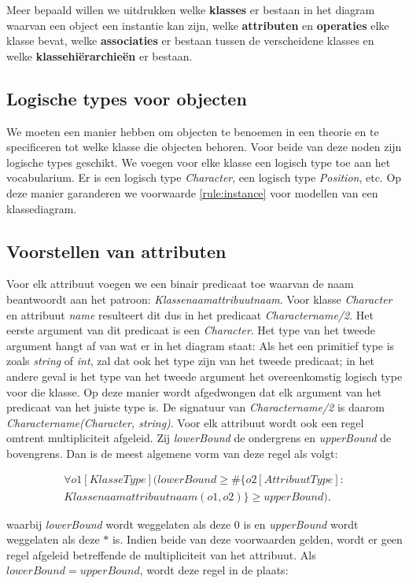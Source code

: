 Meer bepaald willen we uitdrukken welke \textbf{klasses} er bestaan in het diagram waarvan een object een instantie kan zijn, welke \textbf{attributen} en \textbf{operaties} elke klasse bevat, welke \textbf{associaties} er bestaan tussen de verscheidene klasses en welke \textbf{klassehi\"erarchie\"en} er bestaan.

\subsection{Logische types voor objecten}
We moeten een manier hebben om objecten te benoemen in een theorie en te specificeren tot welke klasse die objecten behoren. Voor beide van deze noden zijn logische types geschikt. We voegen voor elke klasse een logisch type toe aan het vocabularium. Er is een logisch type \textit{Character}, een logisch type \textit{Position}, etc. Op deze manier garanderen we voorwaarde \ref{rule:instance} voor modellen van een klassediagram.

\subsection{Voorstellen van attributen}
Voor elk attribuut voegen we een binair predicaat toe waarvan de naam beantwoordt aan het patroon: \textit{Klassenaamattribuutnaam}. Voor klasse \textit{Character} en attribuut \textit{name} resulteert dit dus in het predicaat \textit{Charactername/2}. Het eerste argument van dit predicaat is een \textit{Character}. Het type van het tweede argument hangt af van wat er in het diagram staat: Als het een primitief type is zoals \textit{string} of \textit{int}, zal dat ook het type zijn van het tweede predicaat; in het andere geval is het type van het tweede argument het overeenkomstig logisch type voor die klasse. Op deze manier wordt afgedwongen dat elk argument van het predicaat van het juiste type is.
De signatuur van \textit{Charactername/2} is daarom \textit{Charactername(Character, string)}.
Voor elk attribuut wordt ook een regel omtrent multipliciteit afgeleid. Zij \textit{lowerBound} de ondergrens en \textit{upperBound} de bovengrens. Dan is de meest algemene vorm van deze regel als volgt:
	
\begin{align*}
	\forall{o1}[KlasseType](lowerBound \geq \#\{o2 [AttribuutType] : \\ Klassenaamattribuutnaam(o1,o2)\} \geq upperBound).
\end{align*}
	
waarbij \textit{lowerBound} wordt weggelaten als deze $0$ is en \textit{upperBound} wordt weggelaten als deze $*$ is. Indien beide van deze voorwaarden gelden, wordt er geen regel afgeleid betreffende de multipliciteit van het attribuut. Als $lowerBound = upperBound$, wordt deze regel in de plaats:
	
